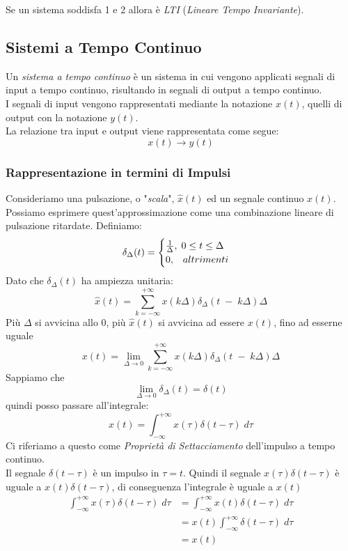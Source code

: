 \documentclass{article}
\begin{document}
			Se un sistema soddisfa 1 e 2 allora è \textit{LTI} (\textit{Lineare Tempo Invariante}).

		\subsection{Sistemi a Tempo Continuo}
			Un \textit{sistema a tempo continuo} è un sistema in cui vengono applicati segnali di input a tempo continuo, risultando in segnali di output a tempo continuo. \\
			I segnali di input vengono rappresentati mediante la notazione $ x(t) $, quelli di output con la notazione $ y(t) $. \\
			La relazione tra input e output viene rappresentata come segue:
			\[
				x(t) \rightarrow y(t)
			\]

			\subsubsection{Rappresentazione in termini di Impulsi}
				Consideriamo una pulsazione, o "\textit{scala}", $ \hat{x}(t) $ ed un segnale continuo $ x(t) $. Possiamo esprimere quest'approssimazione come una combinazione lineare di pulsazione ritardate. Definiamo:
				\[
					\delta_{\Delta}(t)=
					\begin{cases}
						{1\over{\Delta}},\; 0\leq t \leq \Delta \\
						0,\;\;\; altrimenti
					\end{cases}
				\]
				Dato che $ \delta_{\Delta}(t) $ ha ampiezza unitaria:
				\[
					\hat{x}(t)= \sum_{k=-\infty}^{+\infty} {x(k\Delta)\delta_{\Delta}(t\; -\; k\Delta)\Delta}
				\]
				Più $ \Delta $ si avvicina allo 0, più $ \hat{x}(t) $ si avvicina ad essere $ x(t) $, fino ad esserne uguale
				\[
					x(t)= \lim_{\Delta \to 0} \sum_{k=-\infty}^{+\infty} {x(k\Delta)\delta_{\Delta}(t\; -\; k\Delta)\Delta}
				\]
				Sappiamo che
				\[
					\lim_{\Delta \to 0} \delta_\Delta(t) = \delta(t)
				\]
				quindi posso passare all'integrale:
				\[
					x(t) = \int_{-\infty}^{+\infty} x(\tau)\delta(t-\tau)\; d\tau
				\]
				Ci riferiamo a questo come \textit{Proprietà di Settacciamento} dell'impulso a tempo continuo. \\
				Il segnale $ \delta(t-\tau) $ è un impulso in $ \tau=t $. Quindi il segnale $ x(\tau)\delta(t-\tau) $ è uguale a $ x(t)\delta(t-\tau) $, di conseguenza l'integrale è uguale a $ x(t) $
				\[
					\begin{aligned}
						\int_{-\infty}^{+\infty} x(\tau)\delta(t-\tau)\; d\tau &= \int_{-\infty}^{+\infty} x(t)\delta(t-\tau)\; d\tau \\
																			   &= x(t) \int_{-\infty}^{+\infty} \delta(t-\tau)\; d\tau \\
																			   &= x(t)
					\end{aligned}
				\]
\end{document}
